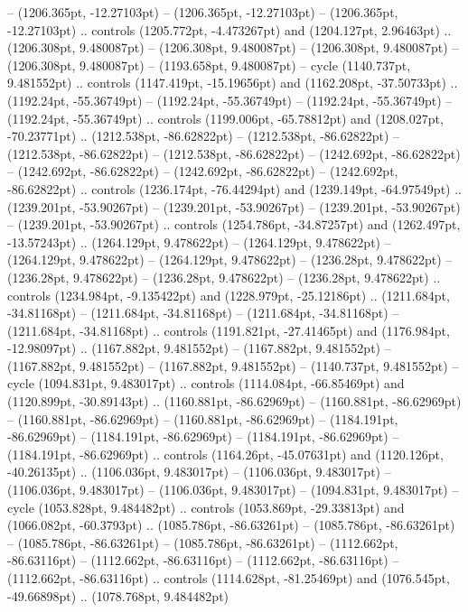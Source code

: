  -- (1206.365pt, -12.27103pt)
 -- (1206.365pt, -12.27103pt)
 -- (1206.365pt, -12.27103pt) .. controls (1205.772pt, -4.473267pt) and (1204.127pt, 2.96463pt) .. (1206.308pt, 9.480087pt)
 -- (1206.308pt, 9.480087pt)
 -- (1206.308pt, 9.480087pt)
 -- (1206.308pt, 9.480087pt)
 -- (1193.658pt, 9.480087pt) -- cycle
(1140.737pt, 9.481552pt) .. controls (1147.419pt, -15.19656pt) and (1162.208pt, -37.50733pt) .. (1192.24pt, -55.36749pt)
 -- (1192.24pt, -55.36749pt)
 -- (1192.24pt, -55.36749pt)
 -- (1192.24pt, -55.36749pt) .. controls (1199.006pt, -65.78812pt) and (1208.027pt, -70.23771pt) .. (1212.538pt, -86.62822pt)
 -- (1212.538pt, -86.62822pt)
 -- (1212.538pt, -86.62822pt)
 -- (1212.538pt, -86.62822pt)
 -- (1242.692pt, -86.62822pt)
 -- (1242.692pt, -86.62822pt)
 -- (1242.692pt, -86.62822pt)
 -- (1242.692pt, -86.62822pt) .. controls (1236.174pt, -76.44294pt) and (1239.149pt, -64.97549pt) .. (1239.201pt, -53.90267pt)
 -- (1239.201pt, -53.90267pt)
 -- (1239.201pt, -53.90267pt)
 -- (1239.201pt, -53.90267pt) .. controls (1254.786pt, -34.87257pt) and (1262.497pt, -13.57243pt) .. (1264.129pt, 9.478622pt)
 -- (1264.129pt, 9.478622pt)
 -- (1264.129pt, 9.478622pt)
 -- (1264.129pt, 9.478622pt)
 -- (1236.28pt, 9.478622pt)
 -- (1236.28pt, 9.478622pt)
 -- (1236.28pt, 9.478622pt)
 -- (1236.28pt, 9.478622pt) .. controls (1234.984pt, -9.135422pt) and (1228.979pt, -25.12186pt) .. (1211.684pt, -34.81168pt)
 -- (1211.684pt, -34.81168pt)
 -- (1211.684pt, -34.81168pt)
 -- (1211.684pt, -34.81168pt) .. controls (1191.821pt, -27.41465pt) and (1176.984pt, -12.98097pt) .. (1167.882pt, 9.481552pt)
 -- (1167.882pt, 9.481552pt)
 -- (1167.882pt, 9.481552pt)
 -- (1167.882pt, 9.481552pt)
 -- (1140.737pt, 9.481552pt) -- cycle
(1094.831pt, 9.483017pt) .. controls (1114.084pt, -66.85469pt) and (1120.899pt, -30.89143pt) .. (1160.881pt, -86.62969pt)
 -- (1160.881pt, -86.62969pt)
 -- (1160.881pt, -86.62969pt)
 -- (1160.881pt, -86.62969pt)
 -- (1184.191pt, -86.62969pt)
 -- (1184.191pt, -86.62969pt)
 -- (1184.191pt, -86.62969pt)
 -- (1184.191pt, -86.62969pt) .. controls (1164.26pt, -45.07631pt) and (1120.126pt, -40.26135pt) .. (1106.036pt, 9.483017pt)
 -- (1106.036pt, 9.483017pt)
 -- (1106.036pt, 9.483017pt)
 -- (1106.036pt, 9.483017pt)
 -- (1094.831pt, 9.483017pt) -- cycle
(1053.828pt, 9.484482pt) .. controls (1053.869pt, -29.33813pt) and (1066.082pt, -60.3793pt) .. (1085.786pt, -86.63261pt)
 -- (1085.786pt, -86.63261pt)
 -- (1085.786pt, -86.63261pt)
 -- (1085.786pt, -86.63261pt)
 -- (1112.662pt, -86.63116pt)
 -- (1112.662pt, -86.63116pt)
 -- (1112.662pt, -86.63116pt)
 -- (1112.662pt, -86.63116pt) .. controls (1114.628pt, -81.25469pt) and (1076.545pt, -49.66898pt) .. (1078.768pt, 9.484482pt)
